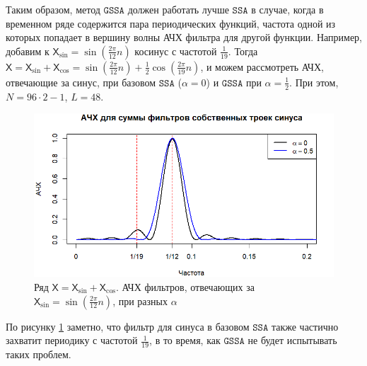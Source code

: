 \documentclass[12pt, specialist, subf
]{disser}
\theoremstyle{definition}
\newcommand{\SSA}{\texttt{SSA}}
\newcommand{\GSSA}{\texttt{GSSA}}
\newcommand{\TS}{\mathsf{X}}
\begin{document}
Таким образом, метод $\GSSA$ должен работать лучше $\SSA$ в случае, когда в временном ряде содержится пара периодических функций, частота одной из которых попадает в вершину волны АЧХ фильтра для другой функции. Например, добавим к $\TS_{\sin} = \sin\left(\frac{2\pi}{12} n \right)$ косинус с частотой $\frac{1}{19}$. Тогда $\TS = \TS_{\sin} + \TS_{\cos} = \sin\left(\frac{2\pi}{12} n \right) + \frac{1}{2}\cos\left(\frac{2\pi}{19} n \right)$, и можем рассмотреть АЧХ, отвечающие за синус, при базовом $\SSA$ ($\alpha = 0$) и $\GSSA$ при $\alpha = \frac{1}{2}$. При этом, $N = 96 \cdot 2 - 1$, $L = 48$.

\begin{figure}[H]
	\centering
	\includegraphics[width=1\textwidth]{img/various_alphas_sin_cos.png}
	\caption{Ряд $\TS = \TS_{\sin} + \TS_{\cos}$. АЧХ фильтров, отвечающих за $\TS_{\sin} = \sin\left(\frac{2\pi}{12} n \right)$, при разных $\alpha$}
	\label{fig:various_alphas_sin_cos}
\end{figure}

По рисунку \ref{fig:various_alphas_sin_cos} заметно, что фильтр для синуса в базовом $\SSA$ также частично захватит периодику с частотой $\frac{1}{19}$, в то время, как $\GSSA$ не будет испытывать таких проблем.
\end{document}
